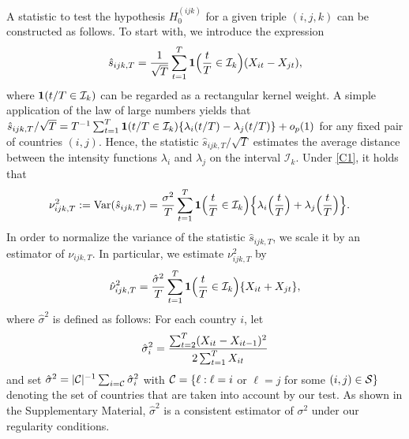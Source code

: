\documentclass[a4paper,12pt]{article}
\numberwithin{equation}{section}
\begin{document}
A statistic to test the hypothesis $H_0^{(ijk)}$ for a given triple $(i,j,k)$ can be constructed as follows. To start with, we introduce the expression 
\[ \hat{s}_{ijk,T} = \frac{1}{\sqrt{T}} \sum\limits_{t=1}^T \boldsymbol{1}\Big(\frac{t}{T} \in \mathcal{I}_k\Big) (X_{it} - X_{jt}), \]
where $\boldsymbol{1}(t/T \in \mathcal{I}_k)$ can be regarded as a rectangular kernel weight. A simple application of the law of large numbers yields that $\hat{s}_{ijk,T}/\sqrt{T} = T^{-1} \sum_{t=1}^T \boldsymbol{1}(t/T \in \mathcal{I}_k) \{\lambda_i(t/T) - \lambda_j(t/T)\} + o_p(1)$ for any fixed pair of countries $(i,j)$. Hence, the statistic $\hat{s}_{ijk,T}/\sqrt{T}$ estimates the average distance between the intensity functions $\lambda_i$ and $\lambda_j$ on the interval $\mathcal{I}_k$. Under \ref{C1}, it holds that
\begin{align*}
\nu_{ijk,T}^2 := \textnormal{Var}(\hat{s}_{ijk,T}) 
 & = \frac{\sigma^2}{T} \sum\limits_{t=1}^T \boldsymbol{1}\Big(\frac{t}{T} \in \mathcal{I}_k\Big) \Big\{ \lambda_i\Big(\frac{t}{T}\Big) + \lambda_j\Big(\frac{t}{T}\Big) \Big\}. 
\end{align*}
In order to normalize the variance of the statistic $\hat{s}_{ijk,T}$, we scale it by an estimator of $\nu_{ijk,T}$. In particular, we estimate $\nu_{ijk,T}^2$ by 
\[ \hat{\nu}_{ijk,T}^2 = \frac{\hat{\sigma}^2}{T} \sum\limits_{t=1}^T \boldsymbol{1}\Big(\frac{t}{T} \in \mathcal{I}_k\Big) \{ X_{it} + X_{jt} \}, \]
where $\hat{\sigma}^2$ is defined as follows: For each country $i$, let 
\begin{align*}
\hat{\sigma}_i^2 = \frac{\sum_{t=2}^T (X_{it}-X_{it-1})^2}{2 \sum_{t=1}^T X_{it}}
\end{align*}
and set $\hat{\sigma}^2 = |\mathcal{C}|^{-1} \sum_{i=\mathcal{C}} \hat{\sigma}_i^2$ with $\mathcal{C} = \{ \ell: \ell = i$ or $\ell = j$ for some $(i,j) \in \mathcal{S} \}$ denoting the set of countries that are taken into account by our test. As shown in the Supplementary Material, $\hat{\sigma}^2$ is a consistent estimator of $\sigma^2$ under our regularity conditions. 
\end{document}
